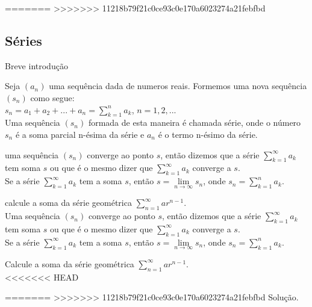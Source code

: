 =======
>>>>>>> 11218b79f21c0ce93c0e170a6023274a21febfbd
\begin{center}
\section{Séries}
\end{center}
Breve introdução
\vspace*{5cm}
\begin{df}
	Seja $\left( a_{n}\right) $ uma sequência dada de numeros reais. Formemos uma nova sequência $\left( s_{n}\right) $ como segue:\\
	$s_{n}=a_{1}+a_{2}+...+a_{n}=\sum_{k=1}^{n} a_{k}$, $n=1,2,...$\\
	Uma sequência $\left( s_{n}\right)$ formada de esta maneira é chamada série, onde o número $s_{n}$ é a soma parcial n-ésima da série e $a_{n}$ é o termo n-ésimo da série.
\end{df}
\begin{df}
	uma sequência $\left( s_{n}\right)$ converge ao ponto $s$, então dizemos que a série $\sum_{k=1}^{\infty} a_{k}$ tem soma $s$ ou que é o mesmo dizer que $\sum_{k=1}^{\infty} a_{k}$ converge a $s$.\\
	Se a série $\sum_{k=1}^{\infty} a_{k}$ tem a soma $s$, então $s=\lim\limits_{n\longrightarrow \infty} s_{n}$, onde $s_{n}=\sum_{k=1}^{n} a_{k}$.
\end{df}
\begin{ex}
	calcule a soma da série geométrica $\sum_{n=1}^{\infty}ar^{n-1}$.\\
	Uma sequência $\left( s_{n}\right)$ converge ao ponto $s$, então dizemos que a série $\sum_{k=1}^{\infty} a_{k}$ tem soma $s$ ou que é o mesmo dizer que $\sum_{k=1}^{\infty} a_{k}$ converge a $s$.\\
	Se a série $\sum_{k=1}^{\infty} a_{k}$ tem a soma $s$, então $s=\lim\limits_{n\longrightarrow \infty} s_{n}$, onde $s_{n}=\sum_{k=1}^{n} a_{k}$.
\end{ex}
\begin{ex}
	Calcule a soma da série geométrica $\sum_{n=1}^{\infty}ar^{n-1}$.\\
<<<<<<< HEAD

=======
>>>>>>> 11218b79f21c0ce93c0e170a6023274a21febfbd
	Solução.
\end{ex}
\vspace*{15cm}

